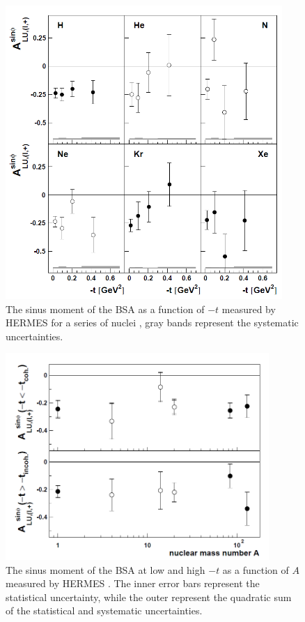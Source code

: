\documentclass{article}
\begin{document}
\begin{figure}[tbp!]
\center
	\includegraphics[width=10.5cm]{fig3/HERMES_BSA.png}
	\caption{The sinus moment of the BSA as a function of $-t$ measured by HERMES
	for a series of nuclei \cite{Airapetian:2009cga}, gray bands represent the systematic 
        uncertainties.}
\label{fig:HERMES1}
\end{figure}

\begin{figure}[tbp!]
\center
\includegraphics[width=10cm]{fig3/HERMES_BSA_2.png}
\caption{The sinus moment of the BSA at low and high $-t$ as a function of $A$ measured by HERMES
	\cite{Airapetian:2009cga}. The inner error bars represent the statistical uncertainty, while 
the outer represent the quadratic sum of the statistical and systematic uncertainties.}
\label{fig:HERMES2}
\end{figure}
\end{document}
